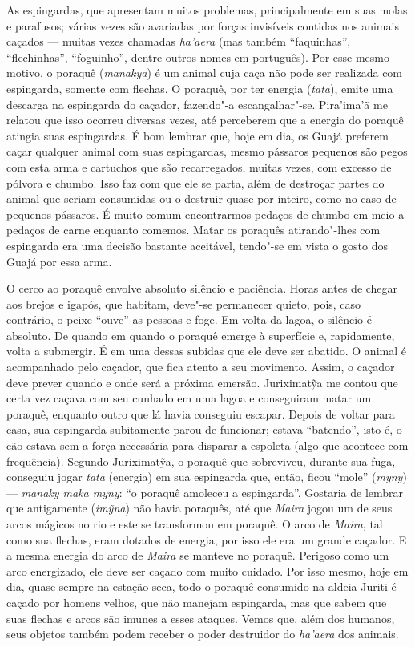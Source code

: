 As espingardas, que apresentam muitos problemas, principalmente em suas
molas e parafusos; várias vezes são avariadas por forças invisíveis
contidas nos animais caçados --- muitas vezes chamadas \emph{ha'aera} (mas
também ``faquinhas'', ``flechinhas'', ``foguinho'', dentre outros nomes em
português). Por esse mesmo motivo, o poraquê (\emph{manakya}) é um
animal cuja caça não pode ser realizada com espingarda, somente com
flechas. O poraquê, por ter energia (\emph{tata}), emite uma descarga na
espingarda do caçador, fazendo"-a escangalhar"-se. Pira'ima'ã me relatou
que isso ocorreu diversas vezes, até perceberem que a energia do poraquê
atingia suas espingardas. É bom lembrar que, hoje em dia, os Guajá
preferem caçar qualquer animal com suas espingardas, mesmo pássaros
pequenos são pegos com esta arma e cartuchos que são recarregados,
muitas vezes, com excesso de pólvora e chumbo. Isso faz com que ele se
parta, além de destroçar partes do animal que seriam consumidas ou o
destruir quase por inteiro, como no caso de pequenos pássaros. É muito
comum encontrarmos pedaços de chumbo em meio a pedaços de carne enquanto
comemos. Matar os poraquês atirando"-lhes com espingarda era uma decisão
bastante aceitável, tendo"-se em vista o gosto dos Guajá por essa arma.

O cerco ao poraquê envolve absoluto silêncio e paciência. Horas antes de
chegar aos brejos e igapós, que habitam, deve"-se permanecer quieto,
pois, caso contrário, o peixe ``ouve'' as pessoas e foge. Em volta da
lagoa, o silêncio é absoluto. De quando em quando o poraquê emerge à
superfície e, rapidamente, volta a submergir. É em uma dessas subidas
que ele deve ser abatido. O animal é acompanhado pelo caçador, que fica
atento a seu movimento. Assim, o caçador deve prever quando e onde será
a próxima emersão. Juriximatỹa me contou que certa vez caçava com seu
cunhado em uma lagoa e conseguiram matar um poraquê, enquanto outro que
lá havia conseguiu escapar. Depois de voltar para casa, sua espingarda
subitamente parou de funcionar; estava ``batendo'', isto é, o cão estava
sem a força necessária para disparar a espoleta (algo que acontece com
frequência). Segundo Juriximatỹa, o poraquê que sobreviveu, durante sua
fuga, conseguiu jogar \emph{tata} (energia) em sua espingarda que,
então, ficou ``mole'' (\emph{myny}) --- \emph{manaky maka myny}: ``o poraquê
amoleceu a espingarda''. Gostaria de lembrar que antigamente
(\emph{imỹna}) não havia poraquês, até que \emph{Maira} jogou um de seus
arcos mágicos no rio e este se transformou em poraquê. O arco de
\emph{Maira}, tal como sua flechas, eram dotados de energia, por isso
ele era um grande caçador. E a mesma energia do arco de \emph{Maira} se
manteve no poraquê. Perigoso como um arco energizado, ele deve ser
caçado com muito cuidado. Por isso mesmo, hoje em dia, quase sempre na
estação seca, todo o poraquê consumido na aldeia Juriti é caçado por
homens velhos, que não manejam espingarda, mas que sabem que suas
flechas e arcos são imunes a esses ataques. Vemos que, além dos humanos,
seus objetos também podem receber o poder destruidor do \emph{ha'aera}
dos animais.

